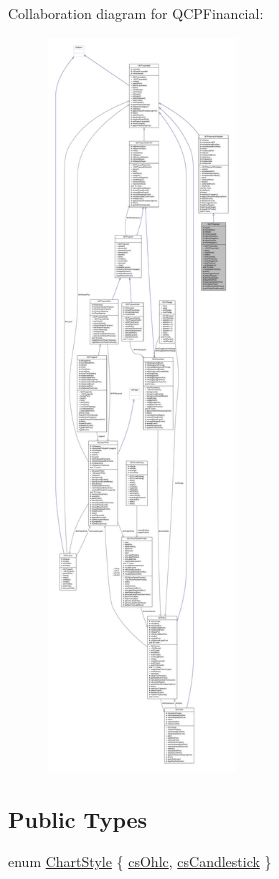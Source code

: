 Collaboration diagram for Q\+C\+P\+Financial\+:\nopagebreak
\begin{figure}[H]
\begin{center}
\leavevmode
\includegraphics[height=550pt]{class_q_c_p_financial__coll__graph}
\end{center}
\end{figure}
\subsection*{Public Types}
\begin{DoxyCompactItemize}
\item 
enum \hyperlink{class_q_c_p_financial_a0f800e21ee98d646dfc6f8f89d10ebfb}{Chart\+Style} \{ \hyperlink{class_q_c_p_financial_a0f800e21ee98d646dfc6f8f89d10ebfba3a516016c9298d3e95dd82aa203c4390}{cs\+Ohlc}, 
\hyperlink{class_q_c_p_financial_a0f800e21ee98d646dfc6f8f89d10ebfbac803cbd39f26e3f206bcc7028679e62f}{cs\+Candlestick}
 \}
\end{DoxyCompactItemize}
